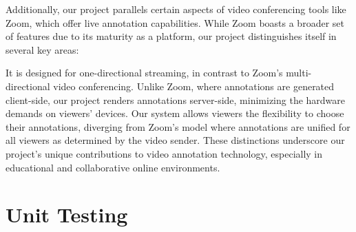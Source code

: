 \documentclass[12pt, titlepage]{article}
\begin{document}
Additionally, our project parallels certain aspects of video conferencing tools
like Zoom, which offer live annotation capabilities. While Zoom boasts a broader
set of features due to its maturity as a platform, our project distinguishes
itself in several key areas:

It is designed for one-directional streaming, in contrast to Zoom's
multi-directional video conferencing. Unlike Zoom, where annotations are
generated client-side, our project renders annotations server-side, minimizing
the hardware demands on viewers' devices. Our system allows viewers the
flexibility to choose their annotations, diverging from Zoom's model where
annotations are unified for all viewers as determined by the video sender. These
distinctions underscore our project's unique contributions to video annotation
technology, especially in educational and collaborative online environments.

\section{Unit Testing}
\end{document}
